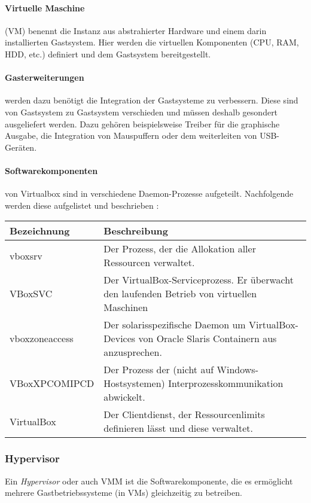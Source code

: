\paragraph{Virtuelle Maschine} (VM) benennt die Instanz aus abstrahierter Hardware und einem
darin installierten Gastsystem. Hier werden die virtuellen Komponenten (CPU, RAM, HDD, etc.)
definiert und dem Gastsystem bereitgestellt.

\paragraph{Gasterweiterungen} werden dazu benötigt die Integration der Gastsysteme zu verbessern.
Diese sind von Gastsystem zu Gastsystem verschieden und müssen deshalb gesondert ausgeliefert werden.
Dazu gehören beispielsweise Treiber für die graphische Ausgabe, die Integration von Mauspuffern
oder dem weiterleiten von USB-Geräten.

\paragraph{Softwarekomponenten} von Virtualbox sind in verschiedene Daemon-Prozesse aufgeteilt.
Nachfolgende werden diese aufgelistet und beschrieben \cite{victor10}:\vspace*{5mm}

    \begin{tabularx}{\textwidth}{|l||X|}
    \hline
      \textbf{Bezeichnung} & \textbf{Beschreibung} \\
    \hline
    \hline
      vboxsrv & Der Prozess, der die Allokation aller Ressourcen verwaltet. \\
    \hline
    \hline
      VBoxSVC & Der VirtualBox-Serviceprozess. Er überwacht den laufenden Betrieb von virtuellen Maschinen \\
    \hline
    \hline
      vboxzoneaccess & Der solarisspezifische Daemon um VirtualBox-Devices von Oracle Slaris Containern aus anzusprechen. \\
    \hline
    \hline
      VBoxXPCOMIPCD & Der Prozess der (nicht auf Windows-Hostsystemen) Interprozesskommunikation abwickelt. \\
    \hline
    \hline
      VirtualBox & Der Clientdienst, der Ressourcenlimits definieren lässt und diese verwaltet. \\
    \hline
    \end{tabularx}%

\subsubsection{Hypervisor}
\label{subsubsec:hypervisor}
Ein \textit{Hypervisor} oder auch \ac{VMM} ist die Softwarekomponente, die es ermöglicht
mehrere Gastbetriebssysteme (in VMs) gleichzeitig zu betreiben.

